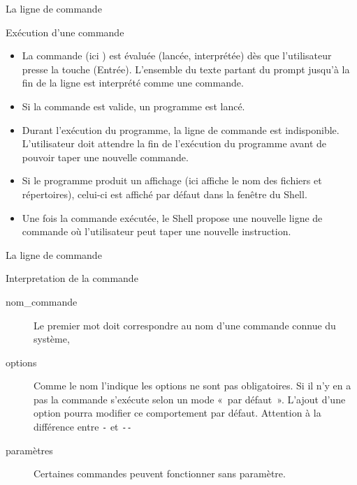 \begin{frame}{La ligne de commande}
  \begin{center}
  \end{center}
  \begin{block}{Exécution d'une commande}
    \begin{itemize}
    \item La commande (ici ) est évaluée (lancée, interprétée)
      dès que l'utilisateur presse la touche \Return
      (Entrée). L'ensemble du texte partant du prompt jusqu'à la fin de
      la ligne est interprété comme une commande.
    \item Si la commande est valide, un programme est lancé.
    \item Durant l'exécution du programme, la ligne de commande est
      indisponible. L'utilisateur doit attendre la fin de l'exécution du
      programme avant de pouvoir taper une nouvelle commande.
    \item Si le programme produit un affichage (ici  affiche le
      nom des fichiers et répertoires), celui-ci est affiché par défaut
      dans la fenêtre du Shell.
    \item Une fois la commande exécutée, le Shell propose une nouvelle
      ligne de commande où l'utilisateur peut taper une nouvelle
      instruction.
    \end{itemize}
  \end{block}
\end{frame}
\begin{frame}{La ligne de commande}
  \begin{center}
  \end{center}
  \begin{block}{Interpretation de la commande}
    \begin{description}
    \item[nom\_commande] Le premier mot doit correspondre au nom d'une
      commande connue du système,
    \item[options] Comme le nom l'indique les options ne sont pas
      obligatoires. Si il n'y en a pas la commande s'exécute selon un
      mode «~par défaut~». L'ajout d'une option pourra modifier ce
      comportement par défaut. Attention à la différence entre \texttt{-} et \texttt{-{}-}
    \item[paramètres] Certaines commandes peuvent fonctionner sans
      paramètre.
    \end{description}
  \end{block}
\end{frame}

